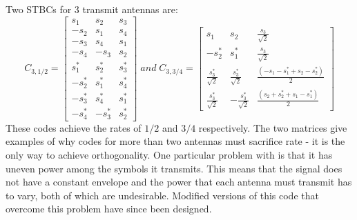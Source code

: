\documentclass{book}
\begin{document}
\begin{itemize}
Two STBCs for 3 transmit antennas are:
\[
C_{3,1/2}=
\left[\begin{array}{ccc}
s_1 & s_2 & s_3\\
-s_2 & s_1 & s_4\\
-s_3 & s_4 & s_1\\
-s_4 & -s_3 & s_2\\
s^*_1 & s^*_2 & s^*_3\\
-s^*_2 & s^*_1 & s^*_4\\
-s^*_3 & s^*_4 & s^*_1\\
-s^*_4 & -s^*_3 & s^*_2
\end{array} \right] \;and\; C_{3,3/4}=
\left[\begin{array}{ccc}
s_1 & s_2 & \frac{s_3}{\sqrt{2}}\\
-s^*_2 & s^*_1 & \frac{s_3}{\sqrt{2}}\\
\frac{s^*_3}{\sqrt{2}} & \frac{s^*_3}{\sqrt{2}} & \frac{(-s_1-s^*_1+s_2-s^*_2)}{2}\\
\frac{s^*_3}{\sqrt{2}} & -\frac{s^*_3}{\sqrt{2}} & \frac{(s_2+s^*_2+s_1-s^*_1)}{2}
\end{array} \right]
\]
These codes achieve the rates of $1/2$ and $3/4$ respectively. The two matrices give examples of why codes for more than two antennas must sacrifice rate - it is the only way to achieve orthogonality. One particular problem with   is that it has uneven power among the symbols it transmits. This means that the signal does not have a constant envelope and the power that each antenna must transmit has to vary, both of which are undesirable. Modified versions of this code that overcome this problem have since been designed.


\end{itemize}
\end{document}
